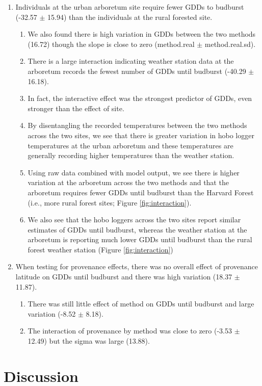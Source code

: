 \documentclass{article}\usepackage[]{graphicx}\usepackage[]{color}
\begin{document}
\begin{enumerate}
\item Individuals at the urban arboretum site require fewer GDDs to budburst (-32.57 $\pm$ 15.94) than the individuals at the rural forested site.
  \begin{enumerate}
  \item We also found there is high variation in GDDs between the two methods (16.72) though the slope is close to zero (method.real $\pm$ method.real.sd).
  \item There is a large interaction indicating weather station data at the arboretum records the fewest number of GDDs until budburst (-40.29 $\pm$ 16.18). 
  \item In fact, the interactive effect was the strongest predictor of GDDs, even stronger than the effect of site.
  \item By disentangling the recorded temperatures between the two methods across the two sites, we see that there is greater variation in hobo logger temperatures at the urban arboretum and these temperatures are generally recording higher temperatures than the weather station.
  \item Using raw data combined with model output, we see there is higher variation at the arboretum across the two methods and that the arboretum requires fewer GDDs until budburst than the Harvard Forest (i.e., more rural forest sites; Figure \ref{fig:interaction}).
  \item We also see that the hobo loggers across the two sites report similar estimates of GDDs until budburst, whereas the weather station at the arboretum is reporting much lower GDDs until budburst than the rural forest weather station (Figure \ref{fig:interaction})
  \end{enumerate}

\item When testing for provenance effects, there was no overall effect of provenance latitude on GDDs until budburst and there was high variation (18.37 $\pm$ 11.87).
  \begin{enumerate}
  \item There was still little effect of method on GDDs until budburst and large variation (-8.52 $\pm$ 8.18).
  \item The interaction of provenance by method was close to zero (-3.53 $\pm$ 12.49) but the sigma was large (13.88).
\end{enumerate}
\end{enumerate}

\section*{Discussion} 
\end{document}
